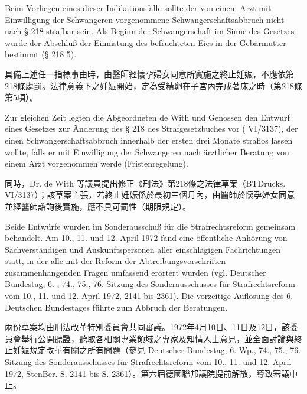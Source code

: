 \documentclass[12pt]{article}
\begin{document}
\syncleft
\begin{sourcepara}
Beim Vorliegen eines dieser Indikationsfälle sollte der von einem Arzt mit Einwilligung der Schwangeren vorgenommene Schwangerschaftsabbruch nicht nach § 218 strafbar sein. Als Beginn der Schwangerschaft im Sinne des Gesetzes wurde der Abschluß der Einnistung des befruchteten Eies in der Gebärmutter bestimmt (§ 218 \abbrAbs{} 5).
\end{sourcepara}
\begin{transpara}
具備上述任一指標事由時，由醫師經懷孕婦女同意所實施之終止妊娠，不應依第218條處罰。法律意義下之妊娠開始，定為受精卵在子宮內完成著床之時（第218條第5項）。
\end{transpara}

\syncleft
\begin{sourcepara}
Zur gleichen Zeit legten die Abgeordneten \abbrDr{} de With und Genossen den Entwurf eines Gesetzes zur Änderung des § 218 des Strafgesetzbuches vor (\abbrBTDrucks{} VI/3137), der einen Schwangerschaftsabbruch innerhalb der ersten drei Monate straflos lassen wollte, falls er mit Einwilligung der Schwangeren nach ärztlicher Beratung von einem Arzt vorgenommen werde (Fristenregelung).
\end{sourcepara}
\begin{transpara}
同時，Dr. de With 等議員提出修正《刑法》第218條之法律草案（BTDrucks. VI/3137）；該草案主張，若終止妊娠係於最初三個月內，由醫師於懷孕婦女同意並經醫師諮詢後實施，應不具可罰性（期限規定）。
\end{transpara}

\syncleft
\begin{sourcepara}
Beide Entwürfe wurden im Sonderausschuß für die Strafrechtsreform gemeinsam behandelt. Am 10., 11. und 12. April 1972 fand eine öffentliche Anhörung von Sachverständigen und Auskunftspersonen aller einschlägigen Fachrichtungen statt, in der alle mit der Reform der Abtreibungsvorschriften zusammenhängenden Fragen umfassend erörtert wurden (vgl. Deutscher Bundestag, 6. \abbrWp{}, 74., 75., 76. Sitzung des Sonderausschusses für Strafrechtsreform vom 10., 11. und 12. April 1972, \abbrStenBer{} \abbrS{} 2141 bis \abbrS{} 2361). Die vorzeitige Auflösung des 6. Deutschen Bundestages führte zum Abbruch der Beratungen.
\end{sourcepara}
\begin{transpara}
兩份草案均由刑法改革特別委員會共同審議。1972年4月10日、11日及12日，該委員會舉行公開聽證，聽取各相關專業領域之專家及知情人士意見，並全面討論與終止妊娠規定改革有關之所有問題（參見 Deutscher Bundestag, 6. Wp., 74., 75., 76. Sitzung des Sonderausschusses für Strafrechtsreform vom 10., 11. und 12. April 1972, StenBer. S. 2141 bis S. 2361）。第六屆德國聯邦議院提前解散，導致審議中止。
\end{transpara}
\end{document}
